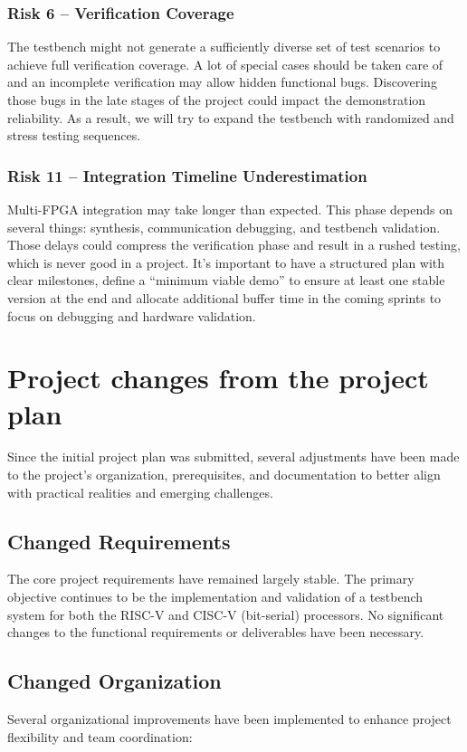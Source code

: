 \documentclass[10pt]{article}
\begin{document}
\subsubsection*{Risk 6 – Verification Coverage}
The testbench might not generate a sufficiently diverse set of test scenarios to achieve full verification coverage. A lot of special cases should be taken care of and an incomplete verification may allow hidden functional bugs. Discovering those bugs in the late stages of the project could impact the demonstration reliability. As a result, we will try to expand the testbench with randomized and stress testing sequences.

\subsubsection*{Risk 11 – Integration Timeline Underestimation}
Multi-FPGA integration may take longer than expected. This phase depends on several things: synthesis, communication debugging, and testbench validation. Those delays could compress the verification phase and result in a rushed testing, which is never good in a project. It’s important to have a structured plan with clear milestones, define a “minimum viable demo” to ensure at least one stable version at the end and allocate additional buffer time in the coming sprints to focus on debugging and hardware validation.



\newpage
\section{Project changes from the project plan}

Since the initial project plan was submitted, several adjustments have been made to the project's organization, prerequisites, and documentation to better align with practical realities and emerging challenges.

\subsection{Changed Requirements}
The core project requirements have remained largely stable. The primary objective continues to be the implementation and validation of a testbench system for both the RISC-V and CISC-V (bit-serial) processors. No significant changes to the functional requirements or deliverables have been necessary.

\subsection{Changed Organization}
Several organizational improvements have been implemented to enhance project flexibility and team coordination:
\end{document}
